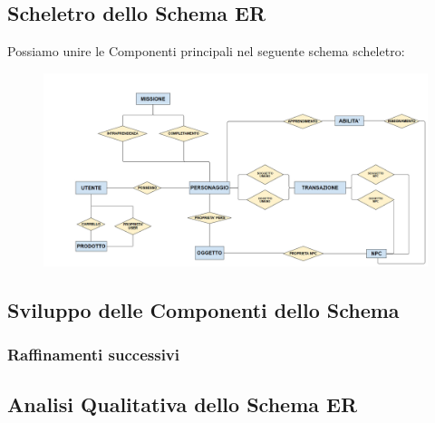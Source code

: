 \documentclass[12pt]{article} %
\begin{document}
		\begin{landscape}

		\subsection{Scheletro dello Schema ER}
			Possiamo unire le Componenti principali nel seguente schema scheletro:

			\begin{figure}[H]
			\centering
			\includegraphics[width=\linewidth]{./immagini/SCHEMASCHELETRO.png}
		\end{figure}

		\end{landscape}

\newpage
		\subsection{Sviluppo delle Componenti dello Schema}

		

			\subsubsection{Raffinamenti successivi}

				

		\subsection{Analisi Qualitativa dello Schema ER}

		

\end{document}
